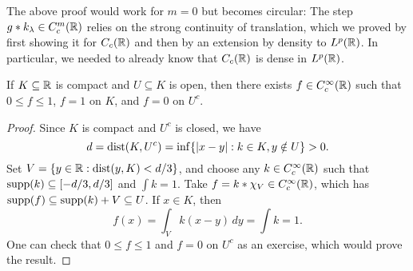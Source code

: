 \begin{remark}
  The above proof would work for $m = 0$
  but becomes circular: The step
  $g * k_{\lambda} \in C_c^m(\mathbb{R})$
  relies on the strong continuity of
  translation, which we proved by first
  showing it for $C_c(\mathbb{R})$ and then by
  an extension by density to
  $L^p(\mathbb{R})$. In particular, we needed to
  already know that $C_c(\mathbb{R})$ is dense
  in $L^p(\mathbb{R})$.
\end{remark}

\begin{prop}
  If $K \subseteq \mathbb{R}$ is compact and
  $U \subseteq K$ is open, then
  there exists $f \in C_c^{\infty}(\mathbb{R})$
  such that $0 \le f \le 1$, $f = 1$ on
  $K$, and $f = 0$ on $U^c$.
\end{prop}

\begin{proof}
  Since $K$ is compact and $U^c$ is closed,
  we have
  \[
    d = \operatorname{dist}(K, U^c)
    = \inf\{|x - y| : k \in K, y \notin U\}
    > 0.
  \]
  Set $V = \{y \in \mathbb{R} : \operatorname{dist}(y, K) < d / 3\}$,
  and choose any $k \in C_c^\infty(\mathbb{R})$
  such that $\operatorname{supp}(k) \subseteq [-d/3, d/3]$
  and $\int k = 1$.
  Take $f = k * \chi_V \in C_c^\infty(\mathbb{R})$,
  which has $\operatorname{supp}(f) \subseteq \operatorname{supp}(k) + V \subseteq U$. If $x \in K$, then
  \[
    f(x) = \int_V k(x - y)\, dy
    = \int k = 1.
  \]
  One can check that $0 \le f \le 1$
  and $f = 0$ on $U^c$
  as an exercise, which would prove
  the result.
\end{proof}

